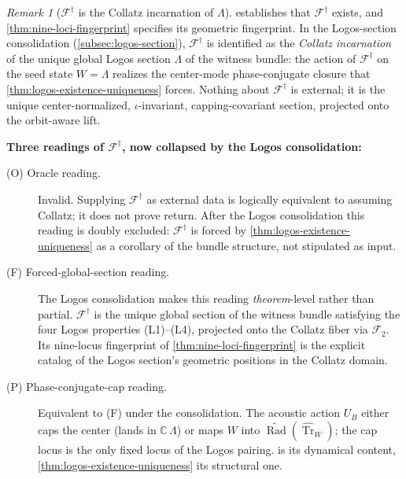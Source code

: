 \documentclass[11pt,a4paper]{article}
\theoremstyle{plain}
\theoremstyle{definition}
\theoremstyle{remark}
\newtheorem{remark}[theorem]{Remark}
\numberwithin{equation}{section}
\newcommand{\Complex}{\mathbb{C}}
\DeclareMathOperator{\Tr}{Tr}
\DeclareMathOperator{\Rad}{Rad}
\begin{document}
\begin{remark}[$\mathcal{F}^{\dagger}$ is the Collatz incarnation of $\Lambda$]
\label{rmk:fdagger-internal-vs-external}
 establishes that
$\mathcal{F}^{\dagger}$ exists, and
\cref{thm:nine-loci-fingerprint} specifies its geometric
fingerprint.  In the Logos-section consolidation
(\cref{subsec:logos-section}), $\mathcal{F}^{\dagger}$ is
identified as the \emph{Collatz incarnation} of the unique global
Logos section $\Lambda$ of the witness bundle: the action of
$\mathcal{F}^{\dagger}$ on the seed state $W=\Lambda$ realizes the
center-mode phase-conjugate closure that
\cref{thm:logos-existence-uniqueness} forces.  Nothing about
$\mathcal{F}^{\dagger}$ is external; it is the unique
center-normalized, $\iota$-invariant, capping-covariant section,
projected onto the orbit-aware lift.

\smallskip
\noindent\textbf{Three readings of $\mathcal{F}^{\dagger}$, now
collapsed by the Logos consolidation:}
\begin{description}
  \item[\textup{(O)} Oracle reading.]  Invalid.  Supplying
        $\mathcal{F}^{\dagger}$ as external data is logically
        equivalent to assuming Collatz; it does not prove return.
        After the Logos consolidation this reading is doubly
        excluded: $\mathcal{F}^{\dagger}$ is forced by
        \cref{thm:logos-existence-uniqueness} as a corollary of the
        bundle structure, not stipulated as input.
  \item[\textup{(F)} Forced-global-section reading.]  The Logos
        consolidation makes this reading
        \emph{theorem}-level rather than partial.
        $\mathcal{F}^{\dagger}$ is the unique global section of the
        witness bundle satisfying the four Logos properties (L1)--(L4),
        projected onto the Collatz fiber via $\mathcal{F}_2$.  Its
        nine-locus fingerprint of \cref{thm:nine-loci-fingerprint}
        is the explicit catalog of the Logos section's geometric
        positions in the Collatz domain.
  \item[\textup{(P)} Phase-conjugate-cap reading.]  Equivalent to (F)
        under the consolidation.  The acoustic action $U_B$ either
        caps the center (lands in $\Complex\,\Lambda$) or maps $W$
        into $\widetilde{\Rad}(\widehat{\Tr}_W)$; the cap locus is
        the only fixed locus of the Logos pairing.
         is its dynamical content,
        \cref{thm:logos-existence-uniqueness} its structural one.
\end{description}


\end{remark}
\end{document}
